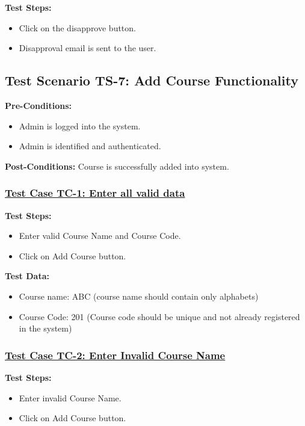 \textbf{Test Steps:}
\begin{itemize}

\item Click on the disapprove button.
\item Disapproval email is sent to the user.

\end{itemize}

\subsection{Test Scenario TS-7: Add Course Functionality}
\textbf{Pre-Conditions: } 
\begin{itemize}

\item Admin is logged into the system.
\item Admin is identified and authenticated.

\end{itemize}

\textbf{Post-Conditions: } Course is successfully added into system.
\subsubsection{\underline{Test Case TC-1: Enter all valid data}}
\textbf{Test Steps:}
\begin{itemize}

\item Enter valid Course Name and Course Code.
\item Click on Add Course button.

\end{itemize}

\textbf{Test Data:}
\begin{itemize}

\item Course name: ABC (course name should contain only alphabets)
\item Course Code: 201 (Course code should be unique and not already registered in the system)

\end{itemize}

\subsubsection{\underline{Test Case TC-2: Enter Invalid Course Name}}
\textbf{Test Steps:}
\begin{itemize}

\item Enter invalid Course Name.
\item Click on Add Course button.

\end{itemize}

